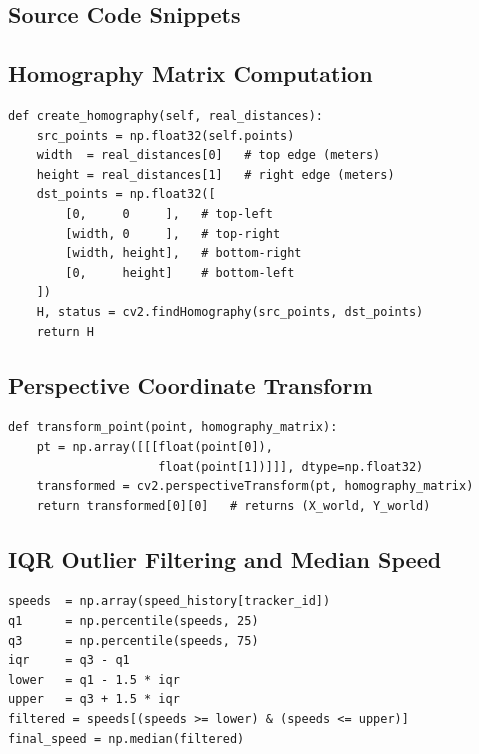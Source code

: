\documentclass[12pt]{report}
\begin{document}
\begin{appendices}

\chapter{Source Code Snippets}

\section{Homography Matrix Computation}
\begin{lstlisting}[caption={Homography creation from four point correspondences},label={lst:homography}]
def create_homography(self, real_distances):
    src_points = np.float32(self.points)
    width  = real_distances[0]   # top edge (meters)
    height = real_distances[1]   # right edge (meters)
    dst_points = np.float32([
        [0,     0     ],   # top-left
        [width, 0     ],   # top-right
        [width, height],   # bottom-right
        [0,     height]    # bottom-left
    ])
    H, status = cv2.findHomography(src_points, dst_points)
    return H
\end{lstlisting}

\section{Perspective Coordinate Transform}
\begin{lstlisting}[caption={Point transformation from pixel space to world space},label={lst:transform}]
def transform_point(point, homography_matrix):
    pt = np.array([[[float(point[0]),
                     float(point[1])]]], dtype=np.float32)
    transformed = cv2.perspectiveTransform(pt, homography_matrix)
    return transformed[0][0]   # returns (X_world, Y_world)
\end{lstlisting}

\section{IQR Outlier Filtering and Median Speed}
\begin{lstlisting}[caption={Robust speed computation on zone exit},label={lst:iqr}]
speeds  = np.array(speed_history[tracker_id])
q1      = np.percentile(speeds, 25)
q3      = np.percentile(speeds, 75)
iqr     = q3 - q1
lower   = q1 - 1.5 * iqr
upper   = q3 + 1.5 * iqr
filtered = speeds[(speeds >= lower) & (speeds <= upper)]
final_speed = np.median(filtered)
\end{lstlisting}


\end{appendices}
\end{document}
